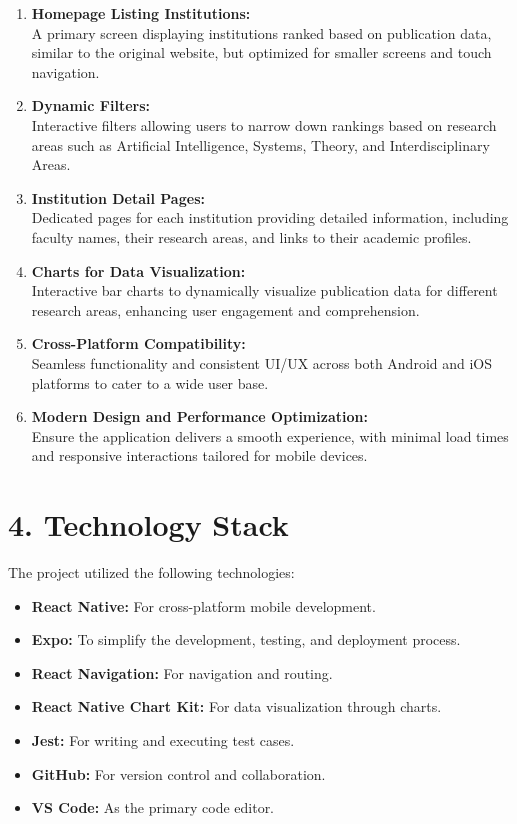 \documentclass[12pt]{article}
\begin{document}
\begin{enumerate}
    \item \textbf{Homepage Listing Institutions:} \\
    A primary screen displaying institutions ranked based on publication data, similar to the original website, but optimized for smaller screens and touch navigation.
    
    \item \textbf{Dynamic Filters:} \\
    Interactive filters allowing users to narrow down rankings based on research areas such as Artificial Intelligence, Systems, Theory, and Interdisciplinary Areas.
    
    \item \textbf{Institution Detail Pages:} \\
    Dedicated pages for each institution providing detailed information, including faculty names, their research areas, and links to their academic profiles.
    
    \item \textbf{Charts for Data Visualization:} \\
    Interactive bar charts to dynamically visualize publication data for different research areas, enhancing user engagement and comprehension.
    
    \item \textbf{Cross-Platform Compatibility:} \\
    Seamless functionality and consistent UI/UX across both Android and iOS platforms to cater to a wide user base.
    
    \item \textbf{Modern Design and Performance Optimization:} \\
    Ensure the application delivers a smooth experience, with minimal load times and responsive interactions tailored for mobile devices.
\end{enumerate}

\bigskip
\section*{4. Technology Stack}

The project utilized the following technologies:

\begin{itemize}
    \item \textbf{React Native:} For cross-platform mobile development.
    \item \textbf{Expo:} To simplify the development, testing, and deployment process.
    \item \textbf{React Navigation:} For navigation and routing.
    \item \textbf{React Native Chart Kit:} For data visualization through charts.
    \item \textbf{Jest:} For writing and executing test cases.
    \item \textbf{GitHub:} For version control and collaboration.
    \item \textbf{VS Code:} As the primary code editor.
\end{itemize}
\end{document}
